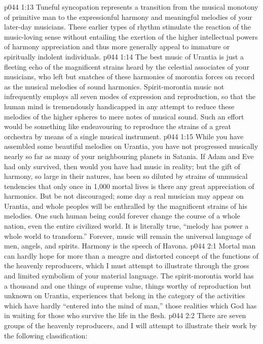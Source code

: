 \vs p044 1:13 Tuneful syncopation represents a transition from the musical monotony of primitive man to the expressionful harmony and meaningful melodies of your later\hyp{}day musicians. These earlier types of rhythm stimulate the reaction of the music\hyp{}loving sense without entailing the exertion of the higher intellectual powers of harmony appreciation and thus more generally appeal to immature or spiritually indolent individuals.
\vs p044 1:14 \pc The best music of Urantia is just a fleeting echo of the magnificent strains heard by the celestial associates of your musicians, who left but snatches of these harmonies of morontia forces on record as the musical melodies of sound harmonics. Spirit\hyp{}morontia music not infrequently employs all seven modes of expression and reproduction, so that the human mind is tremendously handicapped in any attempt to reduce these melodies of the higher spheres to mere notes of musical sound. Such an effort would be something like endeavouring to reproduce the strains of a great orchestra by means of a single musical instrument.
\vs p044 1:15 While you have assembled some beautiful melodies on Urantia, you have not progressed musically nearly so far as many of your neighbouring planets in Satania. If Adam and Eve had only survived, then would you have had music in reality; but the gift of harmony, so large in their natures, has been so diluted by strains of unmusical tendencies that only once in 1,000 mortal lives is there any great appreciation of harmonics. But be not discouraged; some day a real musician may appear on Urantia, and whole peoples will be enthralled by the magnificent strains of his melodies. One such human being could forever change the course of a whole nation, even the entire civilized world. It is literally true, “melody has power a whole world to transform.” Forever, music will remain the universal language of men, angels, and spirits. Harmony is the speech of Havona.
\vs p044 2:1 Mortal man can hardly hope for more than a meagre and distorted concept of the functions of the heavenly reproducers, which I must attempt to illustrate through the gross and limited symbolism of your material language. The spirit\hyp{}morontia world has a thousand and one things of supreme value, things worthy of reproduction but unknown on Urantia, experiences that belong in the category of the activities which have hardly “entered into the mind of man,” those realities which God has in waiting for those who survive the life in the flesh.
\vs p044 2:2 \pc There are seven groups of the heavenly reproducers, and I will attempt to illustrate their work by the following classification:
